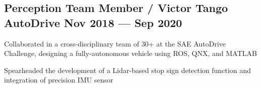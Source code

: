 
\subsection{{Perception Team Member / Victor Tango AutoDrive \hfill Nov 2018 --- Sep 2020}}
\begin{zitemize}
	\item Collaborated in a cross-disciplinary team of 30+ at the SAE AutoDrive Challenge, designing a fully-autonomous vehicle using ROS, QNX, and MATLAB
	\item Spearheaded the development of a Lidar-based stop sign detection function and integration of precision IMU sensor
\end{zitemize}

